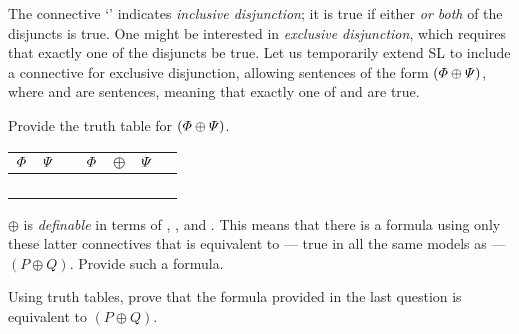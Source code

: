 The connective `\eor' indicates \emph{inclusive disjunction}; it is true if either \emph{or both} of the disjuncts is true. One might be interested in \emph{exclusive disjunction}, which requires that exactly one of the disjuncts be true. Let us temporarily extend SL to include a connective for exclusive disjunction, allowing sentences of the form $(\varPhi{} \oplus \varPsi{})$, where \metaA{} and \metaB{} are sentences, meaning that exactly one of \metaA{} and \metaB{} are true.
	\begin{earg}
		\item Provide the truth table for $(\varPhi{} \oplus \varPsi{})$.
		
		
		\begin{tabular}{@{ }c@{ }@{ }c | c@{ }@{ }c@{ }@{ }c@{ }@{ }c@{ }@{ }c}
$\varPhi{}$ & $\varPsi{}$ &  & $\varPhi{}$ & $\oplus$ & $\varPsi{}$ & \\
\hline 
 &  &  &  &  & & \\
 &  &  &  &  &  & \\
 &  &  &  &  &  & \\
 &  &  &  &  &  & \\
\end{tabular}
		
		
		
		
		\item $\oplus$ is \emph{definable} in terms of \eor, \eand, and \enot. This means that there is a formula using only these latter connectives that is equivalent to --- true in all the same models as --- $(P \oplus Q)$. Provide such a formula.
		\item Using truth tables, prove that the formula provided in the last question is equivalent to $(P \oplus Q)$.
	\end{earg}


